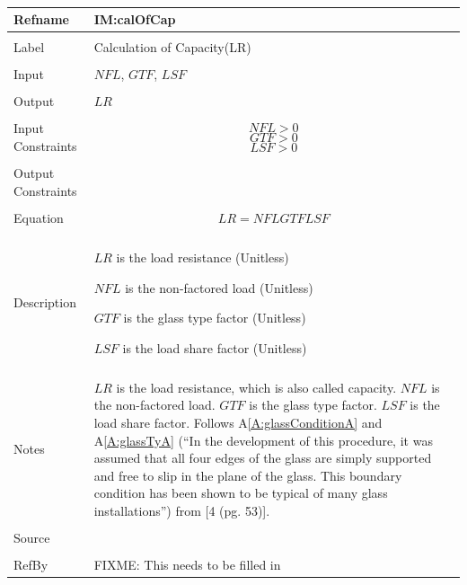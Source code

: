 \documentclass[12pt]{article}
\begin{document}
~\newline
\noindent \begin{minipage}{\textwidth}
\begin{tabular}{p{} p{}}
\toprule \textbf{Refname} & \textbf{IM:calOfCap}
\label{IM:calOfCap}
\\ \midrule \\
Label & Calculation of Capacity(LR)
\\ \midrule \\
Input & $NFL$, $GTF$, $LSF$
\\ \midrule \\
Output & $LR$
\\ \midrule \\
Input Constraints & \begin{dmath}
                    NFL>0
                    \end{dmath}
                    \begin{dmath}
                    GTF>0
                    \end{dmath}
                    \begin{dmath}
                    LSF>0
                    \end{dmath}
\\ \midrule \\
Output Constraints & 
\\ \midrule \\
Equation & \begin{dmath}
           LR=NFL GTF LSF
           \end{dmath}
\\ \midrule \\
Description & \begin{symbDescription}
              \item{$LR$ is the load resistance (Unitless)}
              \item{$NFL$ is the non-factored load (Unitless)}
              \item{$GTF$ is the glass type factor (Unitless)}
              \item{$LSF$ is the load share factor (Unitless)}
              \end{symbDescription}
\\ \midrule \\
Notes & $LR$ is the load resistance, which is also called capacity. $NFL$ is the non-factored load. $GTF$ is the glass type factor. $LSF$ is the load share factor. Follows A\ref{A:glassConditionA} and A\ref{A:glassTyA} (``In the development of this procedure, it was assumed that all four edges of the glass are simply supported and free to slip in the plane of the glass. This boundary condition has been shown to be typical of many glass installations'') from [4 (pg. 53)].
\\ \midrule \\
Source & 
\\ \midrule \\
RefBy & FIXME: This needs to be filled in
\\ \bottomrule \end{tabular}
\end{minipage}\\
\end{document}

